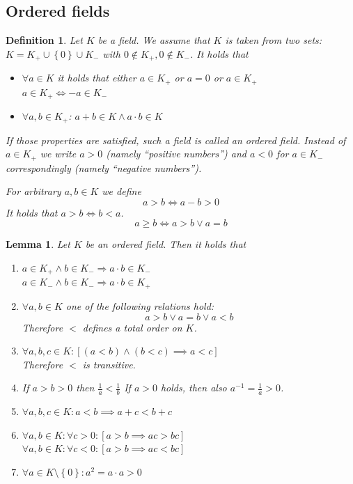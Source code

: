 \documentclass[a4paper,landscape,twocolumn]{article}
\newtheorem{defi}{Definition}
\newtheorem{lemma}{Lemma}
\newcommand\set[1]{\left\{#1\right\}}
\begin{document}
\subsection{Ordered fields}
\begin{defi}
  Let $K$ be a field. We assume that $K$ is taken from two sets: $K = K_+ \cup \set{0} \cup K_-$
  with $0 \not\in K_+, 0 \not\in K_-$. It holds that
  \begin{itemize}
    \item $\forall a \in K$ it holds that either $a \in K_+$ or $a = 0$ or $a \in K_+$ \\
          $a \in K_+ \Leftrightarrow -a \in K_-$
    \item $\forall a, b \in K_+$: $a + b \in K \land a\cdot b \in K$
  \end{itemize}
  If those properties are satisfied, such a field is called an \emph{ordered field}.
  Instead of $a \in K_+$ we write $a > 0$ (namely \enquote{positive numbers})
  and $a < 0$ for $a \in K_-$ correspondingly (namely \enquote{negative numbers}).

  For arbitrary $a, b \in K$ we define
  \[ a > b \Leftrightarrow a - b > 0 \]
  It holds that $a > b \Leftrightarrow b < a$.
  \[ a \geq b \Leftrightarrow a > b \lor a = b \]
\end{defi}

\begin{lemma}
  Let $K$ be an ordered field. Then it holds that
  \begin{enumerate}
    \item $a \in K_+ \land b \in K_- \Rightarrow a \cdot b \in K_-$ \\
          $a \in K_- \land b \in K_- \Rightarrow a \cdot b \in K_+$
    \item $\forall a, b \in K$ one of the following relations hold:
          \[ a > b \lor a = b \lor a < b \]
          Therefore $<$ defines a total order on $K$.
    \item $\forall a, b, c \in K: \left[(a < b) \land (b < c) \implies a < c\right]$ \\
          Therefore $<$ is transitive.
    \item If $a > b > 0$ then $\frac1a < \frac1b$
          If $a > 0$ holds, then also $a^{-1} = \frac1a > 0$.
    \item $\forall a, b, c \in K: a < b \implies a + c < b + c$
    \item $\forall a, b \in K: \forall c > 0: \left[a > b \implies ac > bc\right]$ \\
          $\forall a, b \in K: \forall c < 0: \left[a > b \implies ac < bc\right]$
    \item $\forall a \in K \setminus \set{0}: a^2 = a \cdot a > 0$
  \end{enumerate}
\end{lemma}
\end{document}
